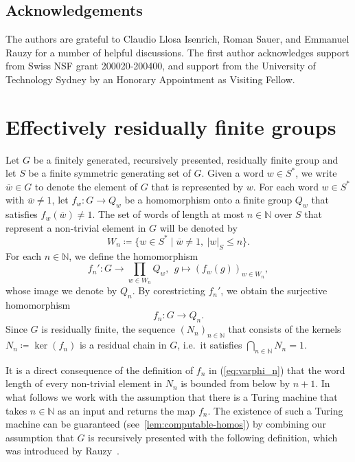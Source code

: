 \documentclass[a4paper]{amsart}
\renewcommand\leq\leqslant
\numberwithin{equation}{section}
\theoremstyle{definition}
\theoremstyle{remark}
\newcommand{\N}{\mathbb{N}}
\newcommand{\defeq}\coloneqq%
\begin{document}
\subsection*{Acknowledgements}
The authors are grateful to Claudio Llosa Isenrich, Roman Sauer, and Emmanuel Rauzy for a number of helpful discussions.
The first author acknowledges support from Swiss NSF grant 200020-200400,
and support from the University of Technology Sydney by an Honorary Appointment as Visiting Fellow.

\section{Effectively residually finite groups}

Let $G$ be a finitely generated, recursively presented, residually finite group and let $S$ be a finite symmetric generating set of $G$.
Given a word $w \in S^*$, we write $\overline{w} \in G$ to denote the element of $G$ that is represented by $w$.
For each word $w \in S^*$ with $\overline{w} \neq 1$, let $f_w \colon G \to Q_w$ be a homomorphism onto a finite group $Q_w$ that satisfies $f_w(\overline w) \neq 1$.
The set of words of length at most $n \in \N$ over $S$ that represent a non-trivial element in $G$ will be denoted by
\begin{equation}\label{eq:word-set-W_n}
    W_n \coloneqq \{ w\in S^* \mid \overline w \neq 1,\ |w|_S\leq n \}.
\end{equation}
For each $n\in \N$, we define the homomorphism
\[
    f_n' \colon G \rightarrow \prod \limits_{w \in W_n} Q_w,\ \ 
    g \mapsto (f_w(g))_{w \in W_n},
\]
whose image we denote by $Q_n$.
By corestricting $f_n'$, we obtain the surjective homomorphism
\begin{equation}\label{eq:varphi_n}
f_n \colon G \to Q_n.
\end{equation}
Since $G$ is residually finite, the sequence $(N_n)_{n \in \N}$ that consists of the kernels $N_n \defeq \ker(f_n)$ is a residual chain in $G$, i.e.\ it satisfies $\bigcap \limits_{n \in \N} N_n = 1$.

It is a direct consequence of the definition of $f_n$ in (\ref{eq:varphi_n}) that the word length of every non-trivial element in $N_n$ is bounded from below by $n+1$.
In what follows we work with the assumption that there is a Turing machine that takes $n \in \N$ as an input and returns the map $f_n$.
The existence of such a Turing machine can be guaranteed (see~\cref{lem:computable-homos}) by combining our assumption that $G$ is recursively presented with the following definition, which was introduced by Rauzy~\cite{Rauzy21Computable,Rauzy2021}.
\end{document}
